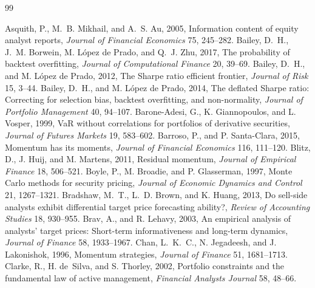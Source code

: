 \begin{thebibliography}{99}
\small
\setlength{\itemsep}{1pt}

 Asquith, P., M.~B. Mikhail, and A.~S. Au, 2005, Information content of equity analyst reports, \emph{Journal of Financial Economics} 75, 245--282.
 Bailey, D.~H., J.~M. Borwein, M. L\'opez de Prado, and Q.~J. Zhu, 2017, The probability of backtest overfitting, \emph{Journal of Computational Finance} 20, 39--69.
 Bailey, D.~H., and M. L\'opez de Prado, 2012, The Sharpe ratio efficient frontier, \emph{Journal of Risk} 15, 3--44.
 Bailey, D.~H., and M. L\'opez de Prado, 2014, The deflated Sharpe ratio: Correcting for selection bias, backtest overfitting, and non-normality, \emph{Journal of Portfolio Management} 40, 94--107.
 Barone-Adesi, G., K. Giannopoulos, and L. Vosper, 1999, VaR without correlations for portfolios of derivative securities, \emph{Journal of Futures Markets} 19, 583--602.
 Barroso, P., and P. Santa-Clara, 2015, Momentum has its moments, \emph{Journal of Financial Economics} 116, 111--120.
 Blitz, D., J. Huij, and M. Martens, 2011, Residual momentum, \emph{Journal of Empirical Finance} 18, 506--521.
 Boyle, P., M. Broadie, and P. Glasserman, 1997, Monte Carlo methods for security pricing, \emph{Journal of Economic Dynamics and Control} 21, 1267--1321.
 Bradshaw, M.~T., L.~D. Brown, and K. Huang, 2013, Do sell-side analysts exhibit differential target price forecasting ability?, \emph{Review of Accounting Studies} 18, 930--955.
 Brav, A., and R. Lehavy, 2003, An empirical analysis of analysts' target prices: Short-term informativeness and long-term dynamics, \emph{Journal of Finance} 58, 1933--1967.
 Chan, L.~K.~C., N. Jegadeesh, and J. Lakonishok, 1996, Momentum strategies, \emph{Journal of Finance} 51, 1681--1713.
 Clarke, R., H. de~Silva, and S. Thorley, 2002, Portfolio constraints and the fundamental law of active management, \emph{Financial Analysts Journal} 58, 48--66.

\end{thebibliography}
